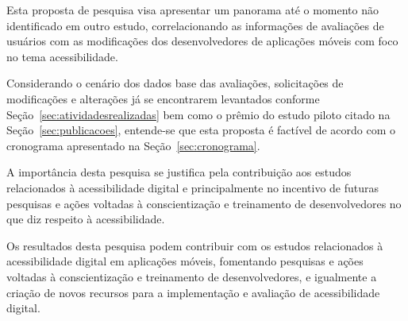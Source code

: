 Esta proposta de pesquisa visa apresentar um panorama até o momento não identificado em outro estudo, correlacionando as informações de avaliações de usuários com as modificações dos desenvolvedores de aplicações móveis com foco no tema acessibilidade.

Considerando o cenário dos dados base das avaliações, solicitações de modificações e alterações já se encontrarem levantados conforme Seção~\ref{sec:atividadesrealizadas} bem como o prêmio do estudo piloto citado na Seção~\ref{sec:publicacoes}, entende-se que esta proposta é factível de acordo com o cronograma apresentado na Seção~\ref{sec:cronograma}.

A importância desta pesquisa se justifica pela contribuição aos estudos relacionados à acessibilidade digital e principalmente no incentivo de futuras pesquisas e ações voltadas à conscientização e treinamento de desenvolvedores no que diz respeito à acessibilidade.

Os resultados desta pesquisa podem contribuir com os estudos relacionados à acessibilidade digital em aplicações móveis, fomentando pesquisas e ações voltadas à conscientização e treinamento de desenvolvedores, e igualmente a criação de novos recursos para
a implementação e avaliação de acessibilidade digital.